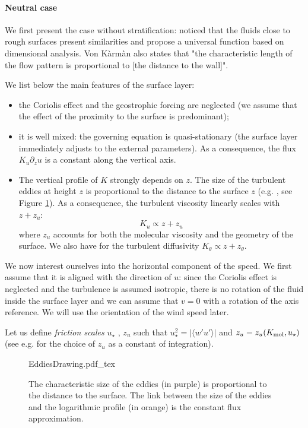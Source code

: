 \paragraph{Neutral case}
We first present the case without stratification:
\citep{karman_mechanische_1930} noticed that the
fluids close to rough surfaces present similarities and
propose a universal function based on dimensional analysis.
Von Kàrmàn also states that "the characteristic length
of the flow pattern is proportional to
[the distance to the wall]".
\par
We list below the main features of the surface layer:
\begin{itemize}
	\item the Coriolis effect and the geostrophic forcing are
		neglected (we assume that the effect of the
		proximity to the surface is predominant);
	\item it is well mixed: the governing equation
		is quasi-stationary (the surface layer
		immediately adjusts to the external parameters).
		As a consequence, the flux $K_u \partial_z u$
		is a constant along the vertical axis.
	\item The vertical profile of $K$ strongly depends 
		on $z$.
		The size of the turbulent eddies at height $z$
		is proportional to the distance to the surface $z$
		(e.g. \cite{kawai_wall-modeling_2012}, see Figure
		\ref{fig:airseaSCM_eddiesDrawing}).
		As a consequence, the turbulent viscosity
		linearly scales with $z+z_u$:
		\begin{equation}
			K_u \propto z+z_u
		\end{equation}
		where $z_u$ accounts for both the molecular
		viscosity and the geometry of the surface.
		We also have for the turbulent diffusivity
		$K_\theta \propto z+z_\theta$.
\end{itemize}
We now interest ourselves into the horizontal component of
the speed. We first assume that it is aligned with the
direction of $u$: since the Coriolis effect
is neglected and the turbulence is assumed isotropic,
there is no rotation of the fluid inside the surface layer
and we can assume that $v=0$
with a rotation of the axis reference.
We will use the orientation of the wind speed later.
\par
Let us define \textit{friction scales} $u_\star$
, $z_{u}$ such that $u_\star^2 =
|\langle w' u' \rangle|$ and
$z_{u} = z_{u}(K_{\rm mol}, u_\star)$
(see e.g. \citep{schlichting_boundary_1960}
for the choice of $z_{u}$ as a constant
of integration).
\begin{figure}
	\centering
	{EddiesDrawing.pdf_tex}
	\caption{The characteristic size of the eddies
	(in purple) is proportional to the distance to the
	surface. The link between the size of the eddies
	and the logarithmic profile (in orange) is
	the constant flux approximation.
	}
	\label{fig:airseaSCM_eddiesDrawing}
\end{figure}
